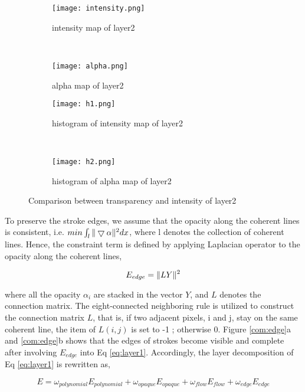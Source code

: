 \begin{figure}[H]
 		\centering
	\begin{subfigure}[b]{0.4\textwidth}
		\centering
		\texttt{[image: intensity.png]}
		\caption{intensity map of layer2}
	\end{subfigure}
	~
	\begin{subfigure}[b]{0.4\textwidth}
		\centering
		\texttt{[image: alpha.png]}
		\caption{alpha map of layer2}
	\end{subfigure}
 

 
	\centering
	\begin{subfigure}[b]{0.4\textwidth}
		\texttt{[image: h1.png]}
		\caption{histogram of intensity map of layer2}
	\end{subfigure}
	~  	
	\begin{subfigure}[b]{0.4\textwidth}
		\texttt{[image: h2.png]}
		\caption{histogram of alpha map of layer2}
	\end{subfigure}
	\caption{Comparison between transparency and intensity of layer2}
	\label{histo}
\end{figure}
 
To preserve the stroke edges, we assume that the opacity along the coherent lines is consistent, i.e. $min \int_{l}\Arrowvert \bigtriangledown\alpha \Arrowvert^2 dx $, where l denotes the collection of coherent lines. Hence, the constraint term is defined by applying Laplacian operator to the opacity along the coherent lines,

\begin{equation} 
E_{edge}=\Arrowvert LY \Arrowvert^2 
\end{equation} 

where all the opacity $\alpha_i$ are stacked in the vector $Y$, and $L$ denotes the connection matrix. The eight-connected neighboring rule is utilized to construct the connection matrix $L$, that is, if two adjacent pixels, i and j, stay on the same coherent line, the item of $L(i,j)$ is set to -1 ; otherwise 0. Figure \ref{com:edge}a and \ref{com:edge}b shows that the edges of strokes become visible and complete after involving $E_{edge}$ into Eq \ref{eq:layer1}.
Accordingly, the layer decomposition of Eq \ref{eq:layer1} is rewritten as,

\begin{equation}
E=\omega_{polynomial}E_{polynomial}+\omega_{opaque}E_{opaque}+\omega_{flow}E_{flow}+\omega_{edge}E_{edge}
\label{eq:layer_sum}
\end{equation} 

